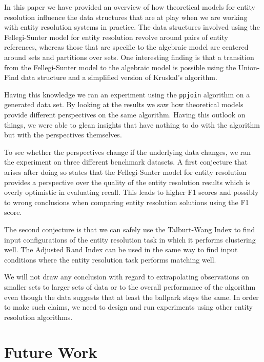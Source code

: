\documentclass[journal]{IEEEtran}
\begin{document}
    In this paper we have provided an overview of how theoretical models for
    entity resolution influence the data structures that are at play when we are
    working with entity resolution systems in practice.
    The data structures involved using the Fellegi-Sunter model for entity
    resolution revolve around pairs of entity references, whereas those that
    are specific to the algebraic model are centered around sets and partitions
    over sets.
    One interesting finding is that a transition from the Fellegi-Sunter model
    to the algebraic model is possible using the Union-Find data structure and
    a simplified version of Kruskal's algorithm.

    Having this knowledge we ran an experiment using the \texttt{ppjoin}
    algorithm on a generated data set.
    By looking at the results we saw how theoretical models provide different
    perspectives on the same algorithm.
    Having this outlook on things, we were able to glean insights that have
    nothing to do with the algorithm but with the perspectives themselves.

    To see whether the perspectives change if the underlying data changes, we
    ran the experiment on three different benchmark datasets.
    A first conjecture that arises after doing so states that the Fellegi-Sunter
    model for entity resolution provides a perspective over the quality of the
    entity resolution results which is overly optimistic in evaluating recall.
    This leads to higher F1 scores and possibly to wrong conclusions when
    comparing entity resolution solutions using the F1 score.

    The second conjecture is that we can safely use the Talburt-Wang Index to
    find input configurations of the entity resolution task in which it performs
    clustering well.
    The Adjusted Rand Index can be used in the same way to find input conditions
    where the entity resolution task performs matching well.

    We will not draw any conclusion with regard to extrapolating observations on
    smaller sets to larger sets of data or to the overall performance of the
    algorithm even though the data suggests that at least the ballpark stays the
    same.
    In order to make such claims, we need to design and run experiments using
    other entity resolution algorithms.

    \section[future]{Future Work}\label{sec:future}
\end{document}
